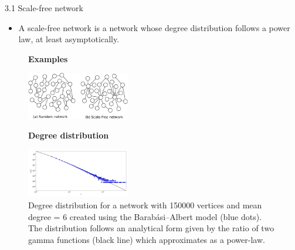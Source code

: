 \documentclass[
  notheorems,
  aspectratio=54,
]{beamer}
\begin{document}
\begin{frame}{3.1 Scale-free network}
  \begin{itemize}
   \item A scale-free network\cite{wiki:scale_free_network} is a network whose degree distribution follows a power law, at least asymptotically.
  \end{itemize}
  \begin{figure}
    \centering
    \textbf{Examples}\par\medskip
    \includegraphics[width=0.4\textwidth]{scale_free_network.png}
  \end{figure}
  \begin{figure}
    \centering
    \textbf{Degree distribution}\par\medskip
    \includegraphics[width=0.4\textwidth]{scale_free_distribution.png}
    \caption{Degree distribution for a network with 150000 vertices and mean degree = 6 created using the Barabási–Albert model (blue dots). The distribution follows an analytical form given by the ratio of two gamma functions (black line) which approximates as a power-law.}
  \end{figure}
\end{frame}
\end{document}
